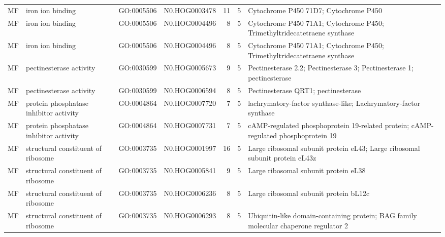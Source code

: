 \begin{table}
\begin{tabular}[t]{llllrrl}
MF & iron ion binding & GO:0005506 & N0.HOG0003478 & 11 & 5 & Cytochrome P450 71D7; Cytochrome P450\\
MF & iron ion binding & GO:0005506 & N0.HOG0004496 & 8 & 5 & Cytochrome P450 71A1; Cytochrome P450; Trimethyltridecatetraene synthase\\
MF & iron ion binding & GO:0005506 & N0.HOG0004496 & 8 & 5 & Cytochrome P450 71A1; Cytochrome P450; Trimethyltridecatetraene synthase\\
MF & pectinesterase activity & GO:0030599 & N0.HOG0005673 & 9 & 5 & Pectinesterase 2.2; Pectinesterase 3; Pectinesterase 1; pectinesterase\\
MF & pectinesterase activity & GO:0030599 & N0.HOG0006594 & 8 & 5 & Pectinesterase QRT1; pectinesterase\\
MF & protein phosphatase inhibitor activity & GO:0004864 & N0.HOG0007720 & 7 & 5 & lachrymatory-factor synthase-like; Lachrymatory-factor synthase\\
MF & protein phosphatase inhibitor activity & GO:0004864 & N0.HOG0007731 & 7 & 5 & cAMP-regulated phosphoprotein 19-related protein; cAMP-regulated phosphoprotein 19\\
MF & structural constituent of ribosome & GO:0003735 & N0.HOG0001997 & 16 & 5 & Large ribosomal subunit protein eL43; Large ribosomal subunit protein eL43z\\
MF & structural constituent of ribosome & GO:0003735 & N0.HOG0005841 & 9 & 5 & Large ribosomal subunit protein eL38\\
MF & structural constituent of ribosome & GO:0003735 & N0.HOG0006236 & 8 & 5 & Large ribosomal subunit protein bL12c\\
MF & structural constituent of ribosome & GO:0003735 & N0.HOG0006293 & 8 & 5 & Ubiquitin-like domain-containing protein; BAG family molecular chaperone regulator 2\\
\bottomrule
\end{tabular}
\end{table}
